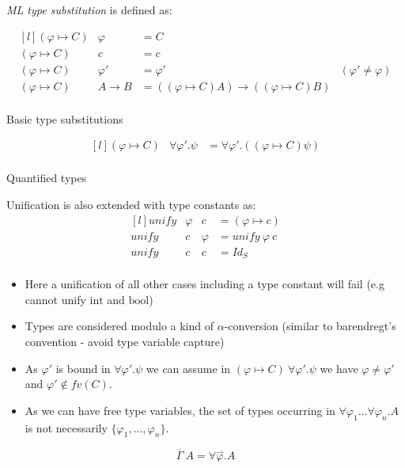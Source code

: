\textit{ML type substitution} is defined as:
\\ \begin{minipage}[b]{.5\textwidth}
	\[\begin{matrix*}[l]
			(\varphi \mapsto C) & \varphi & = C \\
			(\varphi \mapsto C) & c & = c \\
			(\varphi \mapsto C) & \varphi' & = \varphi' & (\varphi' \neq \varphi) \\
			(\varphi \mapsto C) & A \to B & = ((\varphi \mapsto C) A) \to ((\varphi \mapsto C) B) \\
		\end{matrix*}\]
	\centerline{Basic type substitutions}
\end{minipage}
\begin{minipage}[b]{.5\textwidth}
	\[\begin{matrix*}[l]
			(\varphi \mapsto C) & \forall \varphi' . \psi & = \forall \varphi' .((\varphi \mapsto C) \psi) \\
		\end{matrix*}\]
	\centerline{Quantified types}
\end{minipage}
\vspace{2mm}
Unification is also extended with type constants as:
\[\begin{matrix*}[l]
		unify & \varphi & c & = (\varphi \mapsto c) \\
		unify & c & \varphi & = unify \ \varphi \ c \\
		unify & c & c & = Id_S \\
	\end{matrix*}\]
\begin{itemize}
	\item Here a unification of all other cases including a type constant will fail (e.g cannot unify $\text{int}$ and $\text{bool}$)
	\item Types are considered modulo a kind of $\alpha$-conversion (similar to barendregt's convention - avoid type variable capture)
	\item As $\varphi'$ is bound in $\forall \varphi' . \psi$ we can assume in $(\varphi \mapsto C) \ \forall \varphi' . \psi$ we have $\varphi \neq \varphi'$ and $\varphi' \not\in fv(C)$.
	\item As we can have free type variables, the set of types occurring in $\forall \varphi_1 \dots \forall \varphi_n . A$ is not necessarily $\{\varphi_1, \dots , \varphi_n\}$.
\end{itemize}
\[\overline{\Gamma} \ A = \forall \overset{\rightharpoonup}{\varphi} . A\]
